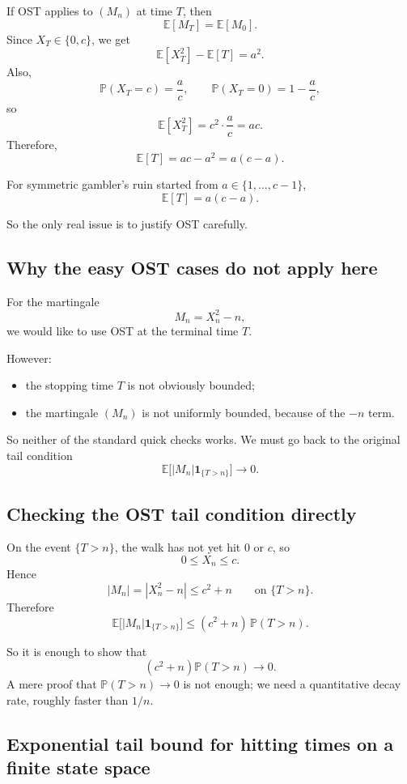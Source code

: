 \documentclass[11pt]{article}
\theoremstyle{definition}
\begin{document}
If OST applies to \((M_n)\) at time \(T\), then
\[
\mathbb E[M_T]=\mathbb E[M_0].
\]
Since \(X_T\in\{0,c\}\), we get
\[
\mathbb E[X_T^2]-\mathbb E[T]=a^2.
\]
Also,
\[
\mathbb P(X_T=c)=\frac{a}{c},
\qquad
\mathbb P(X_T=0)=1-\frac{a}{c},
\]
so
\[
\mathbb E[X_T^2]=c^2\cdot \frac{a}{c}=ac.
\]
Therefore,
\[
\mathbb E[T]=ac-a^2=a(c-a).
\]

\begin{keyformula}
For symmetric gambler's ruin started from \(a\in\{1,\dots,c-1\}\),
\[
\mathbb E[T]=a(c-a).
\]
\end{keyformula}

So the only real issue is to justify OST carefully.

\subsection{Why the easy OST cases do not apply here}

For the martingale
\[
M_n=X_n^2-n,
\]
we would like to use OST at the terminal time \(T\).

However:
\begin{itemize}[leftmargin=2em]
    \item the stopping time \(T\) is not obviously bounded;
    \item the martingale \((M_n)\) is not uniformly bounded, because of the \(-n\) term.
\end{itemize}

So neither of the standard quick checks works. We must go back to the original tail condition
\[
\mathbb E\bigl[|M_n|\mathbf 1_{\{T>n\}}\bigr]\to 0.
\]

\subsection{Checking the OST tail condition directly}

On the event \(\{T>n\}\), the walk has not yet hit \(0\) or \(c\), so
\[
0\le X_n\le c.
\]
Hence
\[
|M_n|=|X_n^2-n|\le c^2+n
\qquad \text{on } \{T>n\}.
\]
Therefore
\[
\mathbb E\bigl[|M_n|\mathbf 1_{\{T>n\}}\bigr]
\le
(c^2+n)\,\mathbb P(T>n).
\]

So it is enough to show that
\[
(c^2+n)\mathbb P(T>n)\to 0.
\]
A mere proof that \(\mathbb P(T>n)\to 0\) is not enough; we need a quantitative decay rate, roughly faster than \(1/n\).

\subsection{Exponential tail bound for hitting times on a finite state space}
\end{document}
